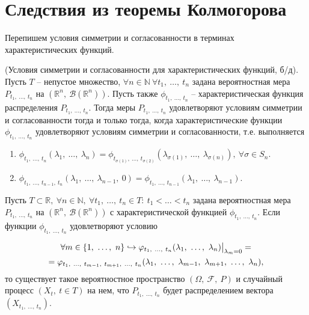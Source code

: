 \section{Следствия из теоремы Колмогорова}

Перепишем условия симметрии и согласованности в терминах характеристических функций.
\begin{theorem}
(Условия симметрии и согласованности для характеристических функций, б/д). Пусть $\displaystyle T$ -- непустое множество, $\displaystyle \forall n\in \mathbb{N} \ \forall t_{1} ,\ \dotsc ,\ t_{n}$ задана вероятностная мера $\displaystyle P_{t_{1} ,\ \dotsc ,\ t_{n}}$ на $\displaystyle \left(\mathbb{R}^{n} ,\ \mathcal{B}\left(\mathbb{R}^{n}\right)\right)$. Пусть также $\displaystyle \phi _{t_{1} ,\ \dotsc ,\ t_{n}}$ -- характеристическая функция распределения $\displaystyle P_{t_{1} ,\ \dotsc ,\ t_{n}}$. Тогда меры $\displaystyle P_{t_{1} ,\ \dotsc ,\ t_{n}}$ удовлетворяют условиям симметрии и согласованности тогда и только тогда, когда характеристические функции $\displaystyle \phi _{t_{1} ,\ \dotsc ,\ t_{n}}$ удовлетворяют условиям симметрии и согласованности, т.е. выполняется

\begin{enumerate}
    \item $\displaystyle \phi _{t_{1} ,\ \dotsc ,\ t_{n}}( \lambda _{1} ,\ \dotsc ,\ \lambda _{n}) =\phi _{t_{\sigma ( 1)} ,\ \dotsc ,\ t_{\sigma ( 2)}}( \lambda _{\sigma ( 1)} ,\ \dotsc ,\ \lambda _{\sigma ( n)}) ,\ \forall \sigma \in S_{n}$.
    \item $\displaystyle \phi _{t_{1} ,\ \dotsc ,\ t_{n-1} ,\ t_{n}}( \lambda _{1} ,\ \dotsc ,\ \lambda _{n-1} ,\ 0) =\phi _{t_{1} ,\ \dotsc ,\ t_{n-1}}( \lambda _{1} ,\ \dotsc ,\ \lambda _{n-1})$.
\end{enumerate}
\end{theorem}
\begin{corollary}
Пусть $\displaystyle T\subset \mathbb{R} ,\ \forall n\in \mathbb{N} ,\ \forall t_{1} ,\ \dotsc ,\ t_{n} \in T:\ t_{1} < \dotsc < t_{n}$ задана вероятностная мера $\displaystyle P_{t_{1} ,\ \dotsc ,\ t_{n}}$ на $\displaystyle \left(\mathbb{R}^{n} ,\ \mathcal{B}\left(\mathbb{R}^{n}\right)\right)$ с характеристической функцией $\displaystyle \phi _{t_{1} ,\ \dotsc ,\ t_{n}}$. Если функции $\displaystyle \phi _{t_{1} ,\ \dotsc ,\ t_{n}}$ удовлетворяют условию

\begin{gather}
\forall m\in \{1,\ \dotsc ,\ n\} \hookrightarrow \phi _{t_{1} ,\ \dotsc ,\ t_{n}}( \lambda _{1} ,\ \dotsc ,\ \lambda _{n}) \big|_{\lambda _{m} =0} =\\
=\phi _{t_{1} ,\ \dotsc ,\ t_{m-1} ,\ t_{m+1} ,\ \dotsc ,\ t_{n}}( \lambda _{1} ,\ \dotsc ,\ \lambda _{m-1} ,\ \lambda _{m+1} ,\ \dotsc ,\ \lambda _{n}) , \notag
\end{gather}
то существует такое вероятностное пространство $\displaystyle ( \Omega ,\ \mathcal{F} ,\ P)$ и случайный процесс $\displaystyle ( X_{t} ,\ t\in T)$ на нем, что $\displaystyle P_{t_{1} ,\ \dotsc ,\ t_{n}}$ будет распределением вектора $\displaystyle ( X_{t_{1} ,\ \dotsc ,\ t_{n}})$.
\end{corollary}
